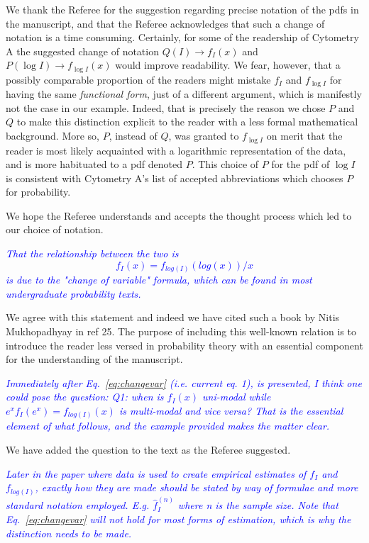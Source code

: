 \documentclass[letter,11pt,draft]{article}
\newcommand{\re}[1]{\emph{\textcolor{blue}{#1}}}
\begin{document}
\smallskip
We thank the Referee for the suggestion regarding precise notation of the pdfs in the manuscript, and that the Referee acknowledges that such a change of notation is a time consuming. Certainly, for some of the readership of Cytometry A the suggested change of notation $Q(I)\rightarrow f_I(x)$ and $P(\log I)\rightarrow f_{\log I}(x)$ would improve readability. We fear, however, that a possibly comparable proportion of the readers might mistake $f_I$ and $f_{\log I}$ for having the same \emph{functional form}, just of a different argument, which is manifestly not the case in our example. Indeed, that is precisely the reason we chose $P$ and $Q$ to make this distinction explicit to the reader with a less formal mathematical background. More so, $P$, instead of $Q$, was granted to $f_{\log I}$ on merit that the reader is most likely acquainted with a logarithmic representation of the data, and is more habituated to a pdf denoted $P$. This choice of $P$ for the pdf of $\log I$ is consistent with Cytometry A's list of accepted abbreviations which chooses $P$ for probability.  

\smallskip
We hope the Referee understands and accepts the thought process which led to our choice of notation.

\re{
That the relationship between the two is
\begin{equation}
   f_I(x) = f_{log(I)}(log(x))/x   
        \label{eq:changevar}         
\end{equation}
is due to the "change of variable" formula, which can be found in most undergraduate probability texts. }

\smallskip
We agree with this statement and indeed we have cited such a book by Nitis Mukhopadhyay in ref 25. The purpose of including this well-known relation is to introduce the reader less versed in probability theory with an essential component for the understanding of the manuscript. 

\re{Immediately after Eq.~\ref{eq:changevar}  (i.e.  current eq. 1), is presented, I think one could pose the question: Q1: when is $f_I(x)$ uni-modal while $e^x f_I(e^x)=f_{log(I)}(x)$ is multi-modal and vice versa? That is the essential element of what follows, and the example provided makes the matter clear.}

\smallskip
We have added the question to the text as the Referee suggested.

\re{
Later in the paper where data is used to create empirical estimates of $f_I$ and $f_{log(I)}$, exactly how they are made should be stated by way of formulae and more standard notation employed. E.g. $\hat{f}^{(n)}_I$ where n is the sample size. Note that Eq.~\ref{eq:changevar} will not hold for most forms of estimation, which is why the distinction needs to be made.
}
\end{document}
